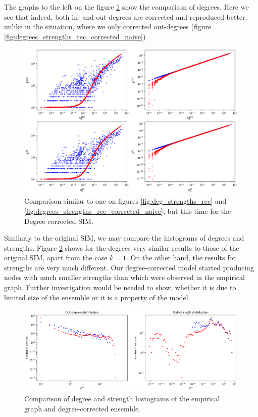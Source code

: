 The graphs to the left on the figure \ref*{fig:degrees_strengths_corrected} show the comparison of degrees. Here we see that indeed, both in- and out-degrees are corrected and reproduced better, unlike in the situation, where we only corrected out-degrees (figure \ref*{fig:degrees_strengths_rec_corrected_naive})
\begin{figure}[!ht]
    \centering
    \includegraphics[scale=0.5]{../img/corrected/degrees_strengths_rec.png}
    \caption{Comparison similar to one on figures \ref{fig:deg_strengths_rec} and \ref*{fig:degrees_strengths_rec_corrected_naive}, but this time for the Degree corrected SIM.}
    \label{fig:degrees_strengths_corrected}
\end{figure}

Similarly to the original SIM, we may compare the histograms of degrees and strengths. Figure \ref*{fig:degrees_strengths_hist_corrected} shows for the degrees very similar results to those of the original SIM, apart from the case $k=1$. On the other hand, the results for strengths are very much different. Our degree-corrected model started producing nodes with much smaller strengths than which were observed in the empirical graph. Further investigation would be needed to show, whether it is due to limited size of the ensemble or it is a property of the model.

\begin{figure}[!ht]
    \centering
    \includegraphics[scale=0.5]{../img/corrected/degrees_strengths_hist.png}
    \caption{Comparison of degree and strength histograms of the empirical graph and degree-corrected ensemble. }
    \label{fig:degrees_strengths_hist_corrected}
\end{figure}

